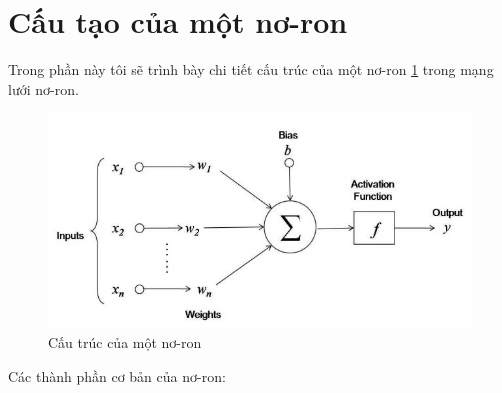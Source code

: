 \section{Cấu tạo của một nơ-ron}
\label{sec:neuralStruct}
Trong phần này tôi sẽ trình bày chi tiết cấu trúc của một nơ-ron \ref{fig:aNeural} trong mạng lưới nơ-ron.
\begin{center}
    \begin{figure}[h]
    \begin{center}
     \includegraphics[scale=0.5]{chap3/image/cauTrucMotNoron.jpg}
    \end{center}
    \caption{Cấu trúc của một nơ-ron}
 	\label{fig:aNeural}
    \end{figure}
\end{center}
\par
 Các thành phần cơ bản của nơ-ron:

